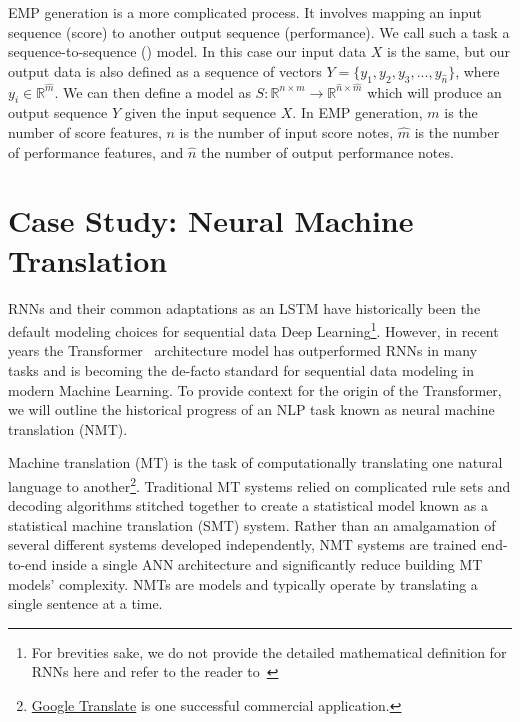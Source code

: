 EMP generation is a more complicated process. It involves mapping an input sequence (score) to another output sequence (performance). We call such a task a sequence-to-sequence (\seq{}) model. In this case our input data $X$ is the same, but our output data is also defined as a sequence of vectors $Y = \{y_1, y_2, y_3, ..., y_{\hat{n}}\}$, where $y_i \in \mathbb{R}^{\hat{m}}$. We can then define a \seq{} model as $S: \mathbb{R}^{n \times m} \rightarrow \mathbb{R}^{\hat{n} \times \hat{m}}$ which will produce an output sequence $Y$ given the input sequence $X$. In EMP generation, $m$ is the number of score features, $n$ is the number of input score notes, $\hat{m}$ is the number of performance features, and $\hat{n}$ the number of output performance notes. 

\section{Case Study: Neural Machine Translation}
RNNs and their common adaptations as an LSTM have historically been the default modeling choices for sequential data Deep Learning\footnote{For brevities sake, we do not provide the detailed mathematical definition for RNNs here and refer to the reader to~\citet{goodfellow2016deep}}. However, in recent years the Transformer~\cite{vaswani2017attention} architecture model has outperformed RNNs in many tasks and is becoming the de-facto standard for sequential data modeling in modern Machine Learning. To provide context for the origin of the Transformer, we will outline the historical progress of an NLP task known as neural machine translation (NMT). 

Machine translation (MT) is the task of computationally translating one natural language to another\footnote{\href{https://translate.google.com/}{Google Translate} is one successful commercial application.}. Traditional MT systems relied on complicated rule sets and decoding algorithms stitched together to create a statistical model known as a statistical machine translation (SMT) system. Rather than an amalgamation of several different systems developed independently, NMT systems are trained end-to-end inside a single ANN architecture and significantly reduce building MT models' complexity. NMTs are \seq{} models and typically operate by translating a single sentence at a time.

